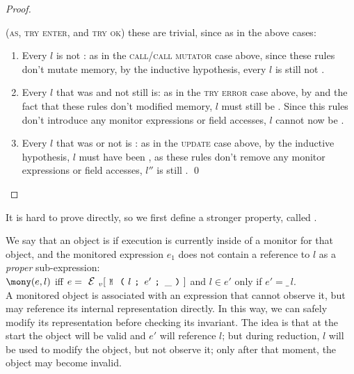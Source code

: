 \begin{proof}
\begin{ienumerate}
	\item (\textsc{as}, \textsc{try enter}, and \textsc{try ok}) these are trivial, since as in the above cases:
	\begin{enumerate}
		\item Every \reach $l$ is not \RCR:
			as in the \textsc{call/call mutator} case above, since these rules don't mutate memory, by the inductive hypothesis, every \reach $l$ is still not \RCR.

		\item Every \reach $l$ that was \RCN and not \RM still is:
			as in the \textsc{try error} case above, by  and the fact that these rules don't modified memory, $l$ must still be \RCN. Since this rules don't introduce any monitor expressions or field accesses, $l$ cannot now be \RM.

		\item Every \reach $l$ that was \RM or not \RCN is \HNO:
			as in the \textsc{update} case above, by the inductive hypothesis, $l$ must have been \HNO, as these rules don't remove any monitor expressions or field accesses, $l''$ is still \HNO.
	\qed\end{enumerate}
\end{ienumerate}
\end{proof}

It is hard to prove  directly,
so we first define a stronger property,
called .

\LS

We say that an object is \mony if execution
is currently inside of a monitor for that object, and
the monitored expression $e_1$ does not
contain a reference to $l$ as a \emph{proper} sub-expression:\\
\indent $\mony(e,l)$ iff
$e=\EV[\M{l}{e'}{\_}]$ and $l \in e'$ only if $e' = \_\,l$.\\
\noindent A monitored object is associated with an expression that cannot observe it, but may
reference its internal representation directly.
In this way, we can safely modify its representation before checking its invariant.
The idea is that at the start the object will be valid and $e'$ will reference $l$;
but during reduction, $l$ will be used to
modify the object, but not observe it; only after that moment, the object may become invalid.

\LS

